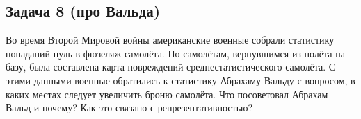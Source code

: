 \documentclass[12pt, a4paper, oneside]{article}
\theoremstyle{plain} %
\theoremstyle{definition}
\begin{document}
\subsection*{Задача  8 (про Вальда)} 

Во время Второй Мировой войны американские военные собрали статистику попаданий пуль в фюзеляж самолёта. По самолётам, вернувшимся из полёта на базу, была составлена карта повреждений среднестатистического самолёта. С этими данными военные обратились к статистику Абрахаму Вальду с вопросом, в каких местах следует увеличить броню самолёта. Что посоветовал Абрахам Вальд и почему? Как это связано с репрезентативностью? 


\end{document}
